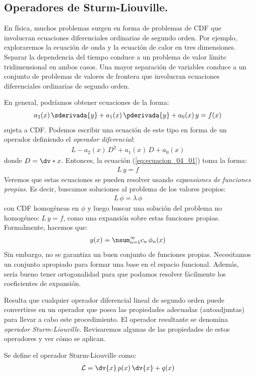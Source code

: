 \subsection{Operadores de Sturm-Liouville.}

En física, muchos problemas surgen en forma de problemas de CDF que involucran ecuaciones diferenciales ordinarias de segundo orden. Por ejemplo, exploraremos la ecuación de onda y la ecuación de calor en tres dimensiones. Separar la dependencia del tiempo conduce a un problema de valor límite tridimensional en ambos casos. Una mayor separación de variables conduce a un conjunto de problemas de valores de frontera que involucran ecuaciones diferenciales ordinarias de segundo orden.
\par
En general, podríamos obtener ecuaciones de la forma:
\begin{align}
a_{2} (x) \, \sderivada{y} + a_{1} (x) \, \pderivada{y} + a_{0} (x) \, y = f(x)
\label{eq:ecuacion_04_01}
\end{align}
sujeta a CDF. Podemos escribir una ecuación de este tipo en forma de un operador definiendo el \emph{operador diferencial}:
\begin{align*}
L - a_{2} (x) \, D^{2} + a_{1} (x) \, D + a_{0} (x)
\end{align*}
donde $D = \dv*{x}$. Entonces, la ecuación (\ref{eq:ecuacion_04_01}) toma la forma:
\begin{align*}
L \, y = f
\end{align*}
Veremos que estas ecuaciones se pueden resolver usando \emph{expansiones de funciones propias}. Es decir, buscamos soluciones al problema de los valores propios:
\begin{align*}
L \, \phi = \lambda \, \phi
\end{align*}
con CDF homogéneas en $\phi$ y luego buscar una solución del problema no homogéneo: $L \, y = f$, como una expansión sobre estas funciones propias. Formalmente, hacemos que:
\begin{align*}
y (x) = \nsum_{n=1}^{\infty} c_{n} \, \phi_{n} (x)
\end{align*}
Sin embargo, no se garantiza un buen conjunto de funciones propias. Necesitamos un conjunto apropiado para formar una base en el espacio funcional. Además, sería bueno tener ortogonalidad para que podamos resolver fácilmente los coeficientes de expansión.
\par
Resulta que cualquier operador diferencial lineal de segundo orden puede convertirse en un operador que posea las propiedades adecuadas (autoadjuntas) para llevar a cabo este procedimiento. El operador resultante se denomina \emph{operador Sturm-Liouville}. Revisaremos algunas de las propiedades de estos operadores y ver cómo se aplican.
\par
Se define el operador Sturm-Liouville como:
\begin{align}
\mathcal{L} = \dv{x} \, p(x) \, \dv{x} + q(x)
\label{eq:ecuacion_04_02}
\end{align}

